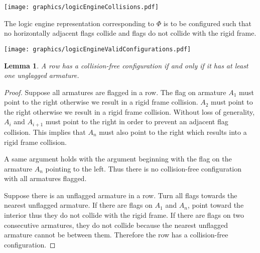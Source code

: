 \documentclass[10pt]{CSUNthesis}
\theoremstyle{plain}%
\newtheorem{lem}{Lemma}
\theoremstyle{definition}
\theoremstyle{remark}
\begin{document}
 \begin{minipage}{\linewidth}
\begin{center}
\texttt{[image: graphics/logicEngineCollisions.pdf]}
\label{fig:logicEngineCollisions.pdf}
\end{center}
\end{minipage}

The logic engine representation corresponding to $\Phi$ is to be configured such that no horizontally adjacent flags collide and flags do not collide with the rigid frame. 

\begin{minipage}{\linewidth}
\begin{center}
\texttt{[image: graphics/logicEngineValidConfigurations.pdf]}
\label{fig:logicEngineValidConfigurations.pdf}
\end{center}
\end{minipage}

\begin{lem}\label{lem:logicEngine1}A row has a collision-free configuration if and only if it has 
at least one unglagged armature. \end{lem}
\begin{proof}

Suppose all armatures are flagged in a row.  The flag on armature $A_1$ must point to the 
right otherwise we result in a rigid frame collision.  $A_2$ must point to the right otherwise 
we result in a rigid frame collision.  Without loss of generality, $A_i$ and $A_{i+1}$ must 
point to the right in order to prevent an adjacent flag collision.  This implies that $A_n$ 
must also point to the right which results into a rigid frame collision.

A same argument holds with the argument beginning with the flag 
on the armature $A_n$ pointing to the left.  Thus there is no collision-free configuration with 
all armatures flagged.


Suppose there is an unflagged armature in a row.  Turn all flags towards the nearest unflagged 
armature.  If there are flags on $A_1$ and $A_n$, point toward the interior thus they do not 
collide with the rigid frame.  If there are flags on two consecutive armatures, they do not collide 
because the nearest unflagged armature cannot be between them.  Therefore the row has a 
collision-free configuration.
\end{proof}
\end{document}
